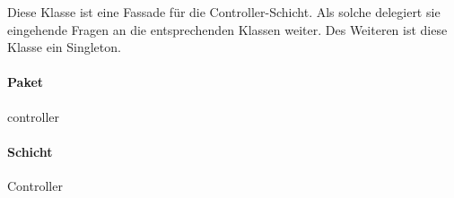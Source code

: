 Diese Klasse ist eine Fassade für die Controller-Schicht.
Als solche delegiert sie eingehende Fragen an die entsprechenden Klassen weiter.
Des Weiteren ist diese Klasse ein Singleton.

\paragraph*{Paket}
controller

\paragraph*{Schicht}
Controller